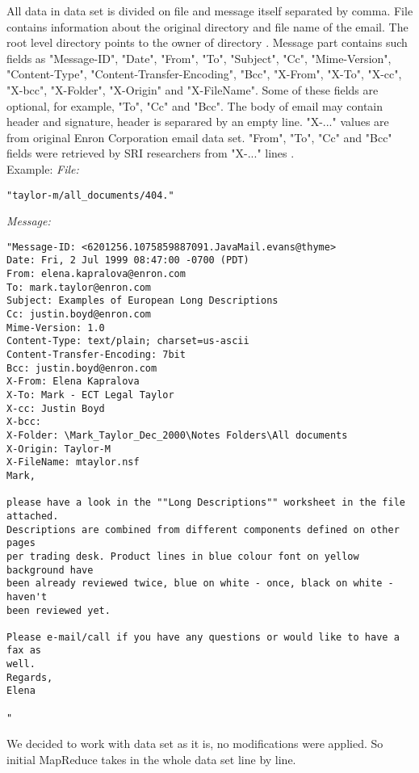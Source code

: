 \documentclass{llncs}
\begin{document}
All data in data set is divided on file and message itself separated by comma. File contains information about the original directory and file name of the email. The root level directory points to the owner of directory \cite{data set}. Message part contains such fields as "Message-ID", "Date", "From", "To", "Subject", "Cc", "Mime-Version", "Content-Type", "Content-Transfer-Encoding", "Bcc", "X-From", "X-To", "X-cc", "X-bcc", "X-Folder", "X-Origin" and "X-FileName". Some of these fields are optional, for example, "To", "Cc" and "Bcc". The body of email may contain header and signature, header is separared by an empty line. "X-..." values are from original Enron Corporation email data set. "From", "To", "Cc" and "Bcc" fields were retrieved by SRI researchers from "X-..." lines  \cite{Enron mining}.\\Example:\newpage
\emph{File:}
\begin{lstlisting}
"taylor-m/all_documents/404."
\end{lstlisting}
\emph{Message:}
\begin{lstlisting}[caption={Example showing structure of the data set that we used as a guide}, label={datasetstructure}]
"Message-ID: <6201256.1075859887091.JavaMail.evans@thyme>
Date: Fri, 2 Jul 1999 08:47:00 -0700 (PDT)
From: elena.kapralova@enron.com
To: mark.taylor@enron.com
Subject: Examples of European Long Descriptions
Cc: justin.boyd@enron.com
Mime-Version: 1.0
Content-Type: text/plain; charset=us-ascii
Content-Transfer-Encoding: 7bit
Bcc: justin.boyd@enron.com
X-From: Elena Kapralova
X-To: Mark - ECT Legal Taylor
X-cc: Justin Boyd
X-bcc:
X-Folder: \Mark_Taylor_Dec_2000\Notes Folders\All documents
X-Origin: Taylor-M
X-FileName: mtaylor.nsf
Mark,

please have a look in the ""Long Descriptions"" worksheet in the file attached.
Descriptions are combined from different components defined on other pages
per trading desk. Product lines in blue colour font on yellow background have
been already reviewed twice, blue on white - once, black on white - haven't
been reviewed yet.

Please e-mail/call if you have any questions or would like to have a fax as
well.
Regards,
Elena

"
\end{lstlisting}

We decided to work with data set as it is, no modifications were applied. So initial MapReduce takes in the whole data set line by line.
\end{document}
